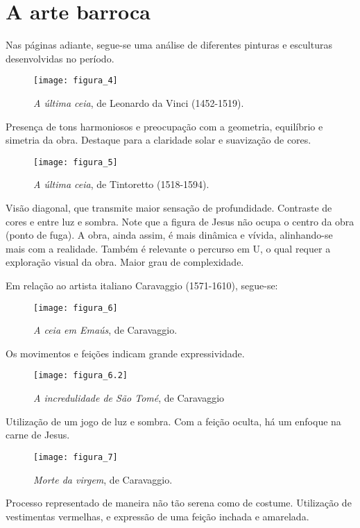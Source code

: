 \documentclass[12pt]{book}
\begin{document}
			\chapter{A arte barroca}
			\par Nas páginas adiante, segue-se uma análise de diferentes pinturas e esculturas desenvolvidas no período.
 			\begin{figure}[h]
				\centering
				\texttt{[image: figura\_4]}
				\caption{\textit{A última ceia}, de Leonardo da Vinci (1452-1519).}
				\label{fig:mesh4}
			\end{figure}
			\par Presença de tons harmoniosos e preocupação com a geometria, equilíbrio e simetria da obra. Destaque para a claridade solar e suavização de cores.
			\begin{figure}[h]
				\centering
				\texttt{[image: figura\_5]}
				\caption{\textit{A última ceia}, de Tintoretto (1518-1594).}
				\label{fig:mesh5}
			\end{figure}
			\par Visão diagonal, que transmite maior sensação de profundidade. Contraste de cores e entre luz e sombra. Note que a figura de Jesus não ocupa o centro da obra (ponto de fuga). A obra, ainda assim, é mais dinâmica e vívida, alinhando-se mais com a realidade. Também é relevante o percurso em U, o qual requer a exploração visual da obra. Maior grau de complexidade.
			\par Em relação ao artista italiano Caravaggio (1571-1610), segue-se:
			\begin{figure}[h]
				\centering
				\texttt{[image: figura\_6]}
				\caption{\textit{A ceia em Emaús}, de Caravaggio.}
				\label{fig:mesh6}
			\end{figure}
			\par Os movimentos e feições indicam grande expressividade. 
			\begin{figure}[h]
				\centering
				\texttt{[image: figura\_6.2]}
				\caption{\textit{A incredulidade de São Tomé}, de Caravaggio}
				\label{fig:mesh6.2}
			\end{figure}
			Utilização de um jogo de luz e sombra. Com a feição oculta, há um enfoque na carne de Jesus.
			\begin{figure}[h]
				\centering
				\texttt{[image: figura\_7]}
				\caption{\textit{Morte da virgem}, de Caravaggio.}
				\label{fig:mesh7}
			\end{figure}
			\par Processo representado de maneira não tão serena como de costume. Utilização de vestimentas vermelhas, e expressão de uma feição inchada e amarelada.
\end{document}
